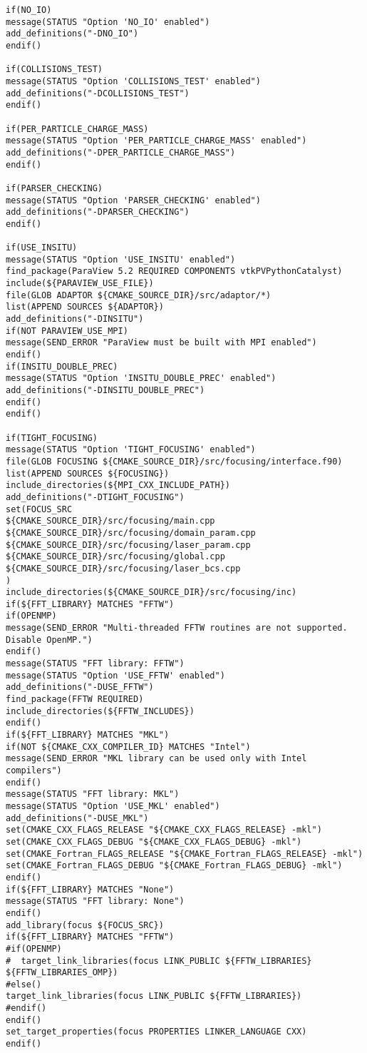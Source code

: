 \begin{lstlisting}[style=FORTRAN, caption=CMakeLists]
if(NO_IO)
message(STATUS "Option 'NO_IO' enabled")
add_definitions("-DNO_IO")
endif()

if(COLLISIONS_TEST)
message(STATUS "Option 'COLLISIONS_TEST' enabled")
add_definitions("-DCOLLISIONS_TEST")
endif()

if(PER_PARTICLE_CHARGE_MASS)
message(STATUS "Option 'PER_PARTICLE_CHARGE_MASS' enabled")
add_definitions("-DPER_PARTICLE_CHARGE_MASS")
endif()

if(PARSER_CHECKING)
message(STATUS "Option 'PARSER_CHECKING' enabled")
add_definitions("-DPARSER_CHECKING")
endif()

if(USE_INSITU)
message(STATUS "Option 'USE_INSITU' enabled")
find_package(ParaView 5.2 REQUIRED COMPONENTS vtkPVPythonCatalyst)
include(${PARAVIEW_USE_FILE})
file(GLOB ADAPTOR ${CMAKE_SOURCE_DIR}/src/adaptor/*)
list(APPEND SOURCES ${ADAPTOR})
add_definitions("-DINSITU")
if(NOT PARAVIEW_USE_MPI)
message(SEND_ERROR "ParaView must be built with MPI enabled")
endif()
if(INSITU_DOUBLE_PREC)
message(STATUS "Option 'INSITU_DOUBLE_PREC' enabled")
add_definitions("-DINSITU_DOUBLE_PREC")
endif()
endif()

if(TIGHT_FOCUSING)
message(STATUS "Option 'TIGHT_FOCUSING' enabled")
file(GLOB FOCUSING ${CMAKE_SOURCE_DIR}/src/focusing/interface.f90)
list(APPEND SOURCES ${FOCUSING})
include_directories(${MPI_CXX_INCLUDE_PATH})
add_definitions("-DTIGHT_FOCUSING")
set(FOCUS_SRC
${CMAKE_SOURCE_DIR}/src/focusing/main.cpp
${CMAKE_SOURCE_DIR}/src/focusing/domain_param.cpp
${CMAKE_SOURCE_DIR}/src/focusing/laser_param.cpp
${CMAKE_SOURCE_DIR}/src/focusing/global.cpp
${CMAKE_SOURCE_DIR}/src/focusing/laser_bcs.cpp
)
include_directories(${CMAKE_SOURCE_DIR}/src/focusing/inc)
if(${FFT_LIBRARY} MATCHES "FFTW")
if(OPENMP)
message(SEND_ERROR "Multi-threaded FFTW routines are not supported. Disable OpenMP.")
endif()
message(STATUS "FFT library: FFTW")
message(STATUS "Option 'USE_FFTW' enabled")
add_definitions("-DUSE_FFTW")
find_package(FFTW REQUIRED)
include_directories(${FFTW_INCLUDES})
endif()
if(${FFT_LIBRARY} MATCHES "MKL")
if(NOT ${CMAKE_CXX_COMPILER_ID} MATCHES "Intel")
message(SEND_ERROR "MKL library can be used only with Intel compilers")
endif()
message(STATUS "FFT library: MKL")
message(STATUS "Option 'USE_MKL' enabled")
add_definitions("-DUSE_MKL")
set(CMAKE_CXX_FLAGS_RELEASE "${CMAKE_CXX_FLAGS_RELEASE} -mkl")
set(CMAKE_CXX_FLAGS_DEBUG "${CMAKE_CXX_FLAGS_DEBUG} -mkl")
set(CMAKE_Fortran_FLAGS_RELEASE "${CMAKE_Fortran_FLAGS_RELEASE} -mkl")
set(CMAKE_Fortran_FLAGS_DEBUG "${CMAKE_Fortran_FLAGS_DEBUG} -mkl")
endif()
if(${FFT_LIBRARY} MATCHES "None")
message(STATUS "FFT library: None")
endif()
add_library(focus ${FOCUS_SRC})
if(${FFT_LIBRARY} MATCHES "FFTW")
#if(OPENMP)
#  target_link_libraries(focus LINK_PUBLIC ${FFTW_LIBRARIES} ${FFTW_LIBRARIES_OMP})
#else()
target_link_libraries(focus LINK_PUBLIC ${FFTW_LIBRARIES})
#endif()
endif()
set_target_properties(focus PROPERTIES LINKER_LANGUAGE CXX)
endif()


\end{lstlisting}
